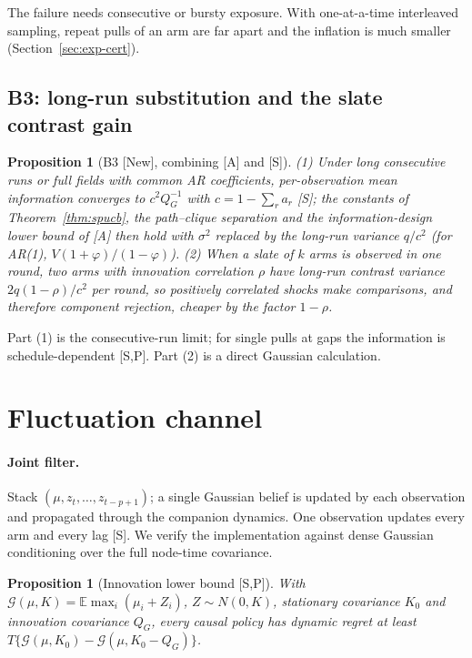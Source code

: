 \documentclass[11pt]{article}
\newtheorem{proposition}[theorem]{Proposition}
\theoremstyle{definition}
\theoremstyle{remark}
\newcommand{\E}{\mathbb{E}}
\newcommand{\src}[1]{\textsf{[#1]}}
\begin{document}
The failure needs consecutive or bursty exposure. With one-at-a-time interleaved sampling, repeat pulls of an arm are far apart and the inflation is much smaller (Section~\ref{sec:exp-cert}).

\subsection{B3: long-run substitution and the slate contrast gain}

\begin{proposition}[B3 \src{New}, combining \src{A} and \src{S}]\label{prop:b3}
(1) Under long consecutive runs or full fields with common AR coefficients, per-observation mean information converges to $c^2Q_G^{-1}$ with $c=1-\sum_ra_r$ \src{S}; the constants of Theorem~\ref{thm:spucb}, the path--clique separation and the information-design lower bound of \src{A} then hold with $\sigma^2$ replaced by the long-run variance $q/c^2$ (for AR(1), $V(1+\varphi)/(1-\varphi)$). (2) When a slate of $k$ arms is observed in one round, two arms with innovation correlation $\rho$ have long-run contrast variance $2q(1-\rho)/c^2$ per round, so positively correlated shocks make comparisons, and therefore component rejection, cheaper by the factor $1-\rho$.
\end{proposition}

Part (1) is the consecutive-run limit; for single pulls at gaps the information is schedule-dependent \src{S,P}. Part (2) is a direct Gaussian calculation.

\section{Fluctuation channel}\label{sec:fluct}

\paragraph{Joint filter.} Stack $(\mu,z_t,\dots,z_{t-p+1})$; a single Gaussian belief is updated by each observation and propagated through the companion dynamics. One observation updates every arm and every lag \src{S}. We verify the implementation against dense Gaussian conditioning over the full node-time covariance.

\begin{proposition}[Innovation lower bound \src{S,P}]\label{prop:floor}
With $\mathcal G(\mu,K)=\E\max_i(\mu_i+Z_i)$, $Z\sim N(0,K)$, stationary covariance $K_0$ and innovation covariance $Q_G$, every causal policy has dynamic regret at least $T\{\mathcal G(\mu,K_0)-\mathcal G(\mu,K_0-Q_G)\}$.
\end{proposition}
\end{document}

